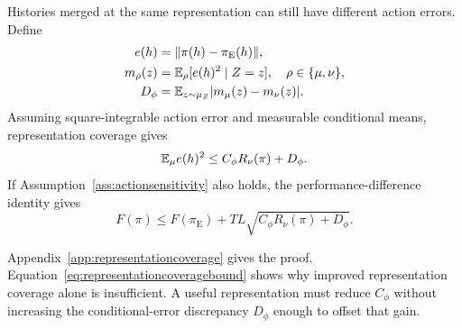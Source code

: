 Histories merged at the same representation can still have different action errors.
Define
\begin{align}
 e(h)&=\lVert\pi(h)-\pi_{\mathrm E}(h)\rVert,\nonumber\\
 m_\rho(z)&=\mathbb E_\rho[e(h)^2\mid Z=z],\quad \rho\in\{\mu,\nu\},\nonumber\\
 D_\phi&=\mathbb E_{z\sim\mu_Z}|m_\mu(z)-m_\nu(z)|.
 \label{eq:conditionalerrordiscrepancy}
\end{align}
Assuming square-integrable action error and measurable conditional means, representation coverage gives
\begin{equation}
 \mathbb E_{\mu}e(h)^2
 \le C_\phi R_\nu(\pi)+D_\phi.
 \label{eq:representationrisktransfer-main}
\end{equation}
If Assumption~\ref{ass:actionsensitivity} also holds, the performance-difference identity gives
\begin{equation}
 F(\pi)\le F(\pi_{\mathrm E})
       +TL\sqrt{C_\phi R_\nu(\pi)+D_\phi}.
 \label{eq:representationcoveragebound}
\end{equation}

Appendix~\ref{app:representationcoverage} gives the proof.
Equation~\eqref{eq:representationcoveragebound} shows why improved representation coverage alone is insufficient.
A useful representation must reduce $C_\phi$ without increasing the conditional-error discrepancy $D_\phi$ enough to offset that gain.
